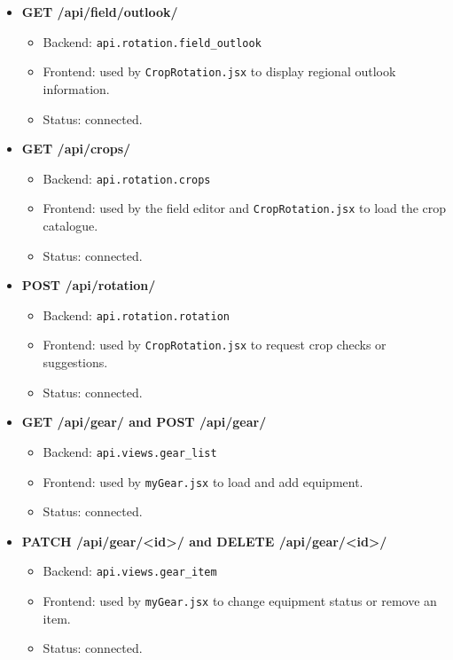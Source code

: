 \documentclass[11pt]{article}
\begin{document}
\begin{itemize}[leftmargin=1.5em, itemsep=0.55em]
\item \textbf{GET /api/field/outlook/}
  \begin{itemize}[leftmargin=1.5em, itemsep=0.2em]
    \item Backend: \texttt{api.rotation.field\_outlook}
    \item Frontend: used by \texttt{CropRotation.jsx} to display regional outlook information.
    \item Status: connected.
  \end{itemize}

\item \textbf{GET /api/crops/}
  \begin{itemize}[leftmargin=1.5em, itemsep=0.2em]
    \item Backend: \texttt{api.rotation.crops}
    \item Frontend: used by the field editor and \texttt{CropRotation.jsx} to load the crop catalogue.
    \item Status: connected.
  \end{itemize}

\item \textbf{POST /api/rotation/}
  \begin{itemize}[leftmargin=1.5em, itemsep=0.2em]
    \item Backend: \texttt{api.rotation.rotation}
    \item Frontend: used by \texttt{CropRotation.jsx} to request crop checks or suggestions.
    \item Status: connected.
  \end{itemize}

\item \textbf{GET /api/gear/ and POST /api/gear/}
  \begin{itemize}[leftmargin=1.5em, itemsep=0.2em]
    \item Backend: \texttt{api.views.gear\_list}
    \item Frontend: used by \texttt{myGear.jsx} to load and add equipment.
    \item Status: connected.
  \end{itemize}

\item \textbf{PATCH /api/gear/<id>/ and DELETE /api/gear/<id>/}
  \begin{itemize}[leftmargin=1.5em, itemsep=0.2em]
    \item Backend: \texttt{api.views.gear\_item}
    \item Frontend: used by \texttt{myGear.jsx} to change equipment status or remove an item.
    \item Status: connected.
  \end{itemize}


\end{itemize}
\end{document}
